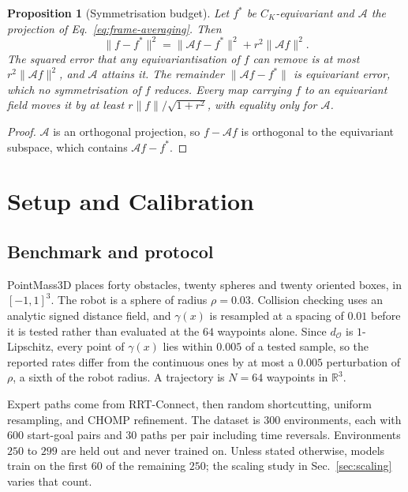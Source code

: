 \documentclass[conference]{IEEEtran}
\newtheorem{proposition}{Proposition}
\begin{document}
\begin{proposition}[Symmetrisation budget]
\label{prop:budget}
Let $f^\ast$ be $C_K$-equivariant and $\mathcal{A}$ the projection of
Eq.~\eqref{eq:frame-averaging}. Then
\begin{equation}
  \|f - f^\ast\|^2 = \|\mathcal{A}f - f^\ast\|^2 + r^2\|\mathcal{A}f\|^2 .
  \label{eq:budget}
\end{equation}
The squared error that any equivariantisation of $f$ can remove is at most
$r^2\|\mathcal{A}f\|^2$, and $\mathcal{A}$ attains it. The remainder
$\|\mathcal{A}f - f^\ast\|$ is equivariant error, which no symmetrisation of $f$
reduces. Every map carrying $f$ to an equivariant field moves it by at least
$r\|f\|/\sqrt{1+r^2}$, with equality only for $\mathcal{A}$.
\end{proposition}
\begin{proof}
$\mathcal{A}$ is an orthogonal projection, so $f - \mathcal{A}f$ is orthogonal to
the equivariant subspace, which contains $\mathcal{A}f - f^\ast$.
\end{proof}

\section{Setup and Calibration}
\subsection{Benchmark and protocol}
\label{sec:protocol}

PointMass3D places forty obstacles, twenty spheres and twenty oriented boxes, in
$[-1,1]^3$. The robot is a sphere of radius $\rho = 0.03$. Collision checking uses an
analytic signed distance field, and $\gamma(x)$ is resampled at a spacing of
$0.01$ before it is tested rather than evaluated at the $64$ waypoints alone.
Since $d_{\mathcal{O}}$ is $1$-Lipschitz, every point of $\gamma(x)$ lies within
$0.005$ of a tested sample, so the reported rates differ from the continuous ones
by at most a $0.005$ perturbation of $\rho$, a sixth of the robot radius. A trajectory
is $N=64$ waypoints in $\mathbb{R}^3$.

Expert paths come from RRT-Connect, then random shortcutting, uniform
resampling, and CHOMP refinement. The dataset is $300$ environments, each with
$600$ start-goal pairs and $30$ paths per pair including time reversals.
Environments $250$ to $299$ are held out and never trained on. Unless stated
otherwise, models train on the first $60$ of the remaining $250$; the scaling
study in Sec.~\ref{sec:scaling} varies that count.
\end{document}

